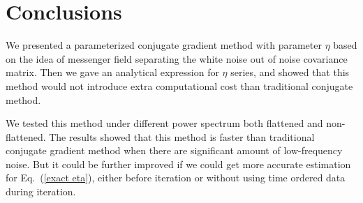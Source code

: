 \documentclass[twocolumn,linenumbers]{aastex631}
\newcommand{\vbd}{\vb{d}}
\newcommand{\hatm}{\vb{\hat{m}}}
\begin{document}
%
%




\section{Conclusions} \label{sec:conclusions} 


We presented a parameterized conjugate gradient method with parameter $\eta$ based on the idea of messenger field
separating the white noise out of noise covariance matrix.
Then we gave an analytical expression for $\eta$ series,
and showed that this method would not introduce extra computational cost than traditional conjugate method.

We tested this method under different power spectrum both flattened and non-flattened.
The results showed that this method is faster than traditional conjugate gradient method 
when there are significant amount of low-frequency noise.
But it could be further improved if we could get more accurate estimation for Eq.~(\ref{exact eta}),
either before iteration or without using time ordered data during iteration.
\end{document}

